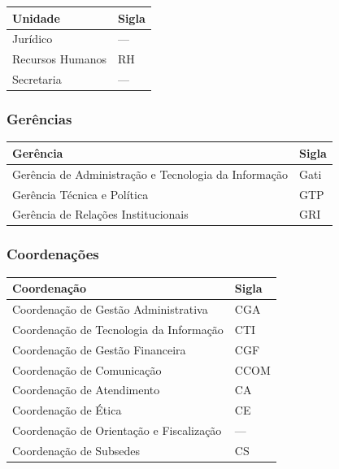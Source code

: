 \begin{center}
	\footnotesize
	\begin{tabularx}{0.8\textwidth}{
			>{\centering\arraybackslash}X
			>{\centering\arraybackslash}X  }
		\toprule
    \textbf{Unidade} & \textbf{Sigla} \\
    \midrule
    Jurídico & ---  \\
    Recursos Humanos & RH\\
    Secretaria & ---  \\
    \bottomrule
  \end{tabularx}
\end{center}

\subsubsection{Gerências}

\begin{center}
	\footnotesize
	\begin{tabularx}{0.8\textwidth}{
			>{\centering\arraybackslash}X
			>{\centering\arraybackslash}X  }
		\toprule
    \textbf{Gerência} & \textbf{Sigla} \\
    \midrule
    Gerência de Administração e Tecnologia da Informação & Gati  \\
    \midrule
    Gerência Técnica e Política & GTP  \\
    \midrule
    Gerência de Relações Institucionais & GRI  \\
    \bottomrule
  \end{tabularx}
\end{center}

\subsubsection{Coordenações}

\begin{center}
\footnotesize
  \begin{tabularx}{0.8\textwidth}{
		>{\centering\arraybackslash}X
		>{\centering\arraybackslash}X  }
	\toprule
    \textbf{Coordenação} & \textbf{Sigla} \\
    \midrule
    Coordenação de Gestão Administrativa & CGA  \\
    \midrule
    Coordenação de Tecnologia da Informação & CTI  \\
    \midrule
    Coordenação de Gestão Financeira & CGF  \\
    \midrule
    Coordenação de Comunicação & CCOM  \\
    \midrule
    Coordenação de Atendimento & CA  \\
    \midrule
    Coordenação de Ética & CE  \\
    \midrule
    Coordenação de Orientação e Fiscalização & ---  \\
    \midrule
    Coordenação de Subsedes & CS  \\
    \bottomrule
  \end{tabularx}
\end{center}